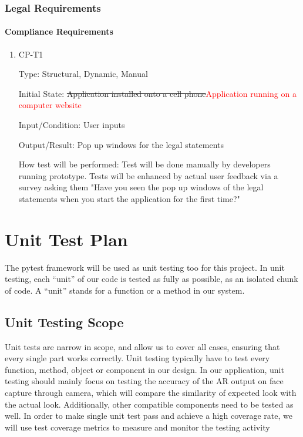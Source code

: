 \documentclass[12pt, titlepage]{article}
\begin{document}
\subsubsection{Legal Requirements}
		
\paragraph{Compliance Requirements}

\begin{enumerate}

\item{CP-T1\\}

Type: Structural, Dynamic, Manual
					
Initial State: \sout{Application installed onto a cell phone}\textcolor{red}{Application running on a computer website}
					
Input/Condition: User inputs
					
Output/Result: Pop up windows for the legal statements
					
How test will be performed: Test will be done manually by developers running prototype. Tests will be enhanced by actual user feedback via a survey asking them "Have you seen the pop up windows of the legal statements when you start the application for the first time?"

\end{enumerate}

\section{Unit Test Plan}
The pytest framework will be used as unit testing too for this project. In unit testing, each “unit” of our code is tested as fully as possible, as an isolated chunk of code. A “unit” stands for a function or a method in our system.


\subsection{Unit Testing Scope}
Unit tests are narrow in scope, and allow us to cover all cases, ensuring that every single part works correctly. Unit testing typically have to test every function, method, object or component in our design. In our application, unit testing should mainly focus on testing the accuracy of the AR output on face capture through camera, which will compare the similarity of expected look with the actual look. Additionally, other compatible components need to be tested as well. In order to make single unit test pass and achieve a high coverage rate, we will use test coverage metrics to measure and monitor the testing activity\\
\end{document}
